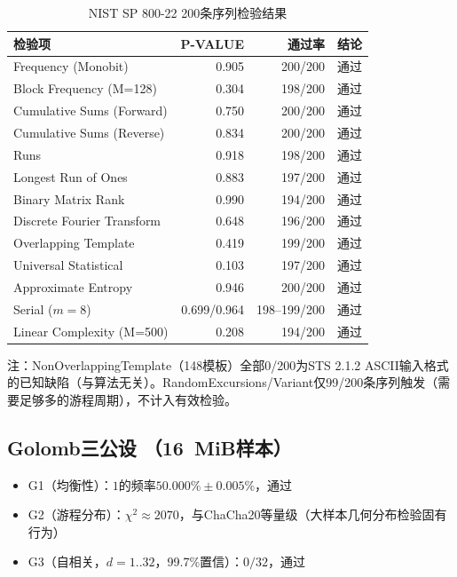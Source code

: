 \documentclass[11pt,a4paper]{ctexart}
\begin{document}
\begin{table}[H]
\centering
\begin{tabular}{@{}lrrl@{}}
\toprule
\textbf{检验项} & \textbf{P-VALUE} & \textbf{通过率} & \textbf{结论} \\
\midrule
Frequency (Monobit)        & 0.905 & 200/200 & 通过 \\
Block Frequency (M=128)    & 0.304 & 198/200 & 通过 \\
Cumulative Sums (Forward)  & 0.750 & 200/200 & 通过 \\
Cumulative Sums (Reverse)  & 0.834 & 200/200 & 通过 \\
Runs                       & 0.918 & 198/200 & 通过 \\
Longest Run of Ones        & 0.883 & 197/200 & 通过 \\
Binary Matrix Rank         & 0.990 & 194/200 & 通过 \\
Discrete Fourier Transform & 0.648 & 196/200 & 通过 \\
Overlapping Template       & 0.419 & 199/200 & 通过 \\
Universal Statistical      & 0.103 & 197/200 & 通过 \\
Approximate Entropy        & 0.946 & 200/200 & 通过 \\
Serial ($m=8$)             & 0.699/0.964 & 198--199/200 & 通过 \\
Linear Complexity (M=500)  & 0.208 & 194/200 & 通过 \\
\bottomrule
\end{tabular}
\caption{NIST SP 800-22 200条序列检验结果}
\label{tab:nist200}
\end{table}

注：NonOverlappingTemplate（148模板）全部0/200为STS 2.1.2 ASCII输入格式的已知缺陷（与算法无关）。RandomExcursions/Variant仅99/200条序列触发（需要足够多的游程周期），不计入有效检验。

\subsection{Golomb三公设 \cite{golomb}（16~MiB样本）}

\begin{itemize}
\item G1（均衡性）：$1$的频率$50.000\% \pm 0.005\%$，通过
\item G2（游程分布）：$\chi^2 \approx 2070$，与ChaCha20等量级（大样本几何分布检验固有行为）
\item G3（自相关，$d=1..32$，99.7\%置信）：$0/32$，通过
\end{itemize}
\end{document}
